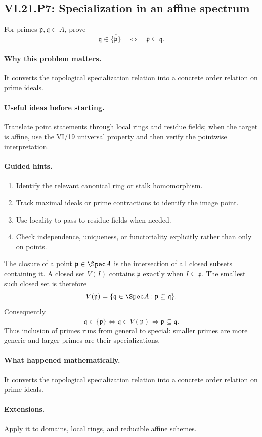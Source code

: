 \subsection*{VI.21.P7: Specialization in an affine spectrum}
\begin{problem}\label{prob:vi21-p07}
For primes $\mathfrak p,\mathfrak q\subset A$, prove
\[
\mathfrak q\in\overline{\{\mathfrak p\}}
\quad\Longleftrightarrow\quad
\mathfrak p\subseteq\mathfrak q.
\]
\end{problem}

\ifdefined\FullProblemDossiers
\paragraph{Why this problem matters.}
It converts the topological specialization relation into a concrete order relation on prime ideals.

\paragraph{Useful ideas before starting.}
Translate point statements through local rings and residue fields; when the target is affine, use the VI/19 universal property and then verify the pointwise interpretation.

\paragraph{Guided hints.}
\begin{enumerate}
\item Identify the relevant canonical ring or stalk homomorphism.
\item Track maximal ideals or prime contractions to identify the image point.
\item Use locality to pass to residue fields when needed.
\item Check independence, uniqueness, or functoriality explicitly rather than only on points.
\end{enumerate}

\begin{solution}
The closure of a point $\mathfrak p\in\Spec A$ is the intersection of all closed subsets
containing it.  A closed set $V(I)$ contains $\mathfrak p$ exactly when $I\subseteq\mathfrak p$.
The smallest such closed set is therefore
\[
V(\mathfrak p)=\{\mathfrak q\in\Spec A:\mathfrak p\subseteq\mathfrak q\}.
\]
Consequently
\[
\mathfrak q\in\overline{\{\mathfrak p\}}
\iff \mathfrak q\in V(\mathfrak p)
\iff \mathfrak p\subseteq\mathfrak q.
\]
Thus inclusion of primes runs from general to special: smaller primes are more generic and larger
primes are their specializations.
\end{solution}

\paragraph{What happened mathematically.}
It converts the topological specialization relation into a concrete order relation on prime ideals.

\paragraph{Extensions.}
Apply it to domains, local rings, and reducible affine schemes.
\fi
